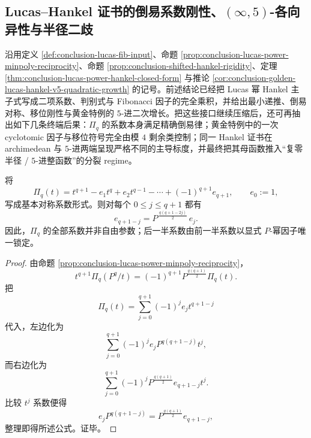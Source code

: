 \subsection{Lucas--Hankel 证书的倒易系数刚性、\texorpdfstring{$(\infty,5)$}{(∞,5)}-各向异性与半径二歧}\label{subsec:conclusion-lucas-hankel-reciprocity-anisotropy-radius}
沿用定义 \ref{def:conclusion-lucas-fib-input}、命题 \ref{prop:conclusion-lucas-power-minpoly-reciprocity}、命题 \ref{prop:conclusion-shifted-hankel-rigidity}、定理 \ref{thm:conclusion-lucas-power-hankel-closed-form} 与推论 \ref{cor:conclusion-golden-lucas-hankel-v5-quadratic-growth} 的记号。前述结论已经把 Lucas 幂 Hankel 主子式写成二项系数、判别式与 Fibonacci 因子的完全乘积，并给出最小递推、倒易对称、移位刚性与黄金特例的 \(5\)-进二次增长。把这些接口继续压缩后，还可再抽出如下几条终端后果：\(\Pi_q\) 的系数本身满足精确倒易律；黄金特例中的一次 cyclotomic 因子与移位符号完全由模 \(4\) 剩余类控制；同一 Hankel 证书在 archimedean 与 \(5\)-进两端呈现严格不同的主导标度，并最终把其母函数推入“复零半径 / \(5\)-进整函数”的分裂 regime。

\begin{corollary}\label{cor:conclusion-lucas-piq-coefficient-reciprocity}
将
\[
\Pi_q(t)
=
t^{q+1}-e_1t^q+e_2t^{q-1}-\cdots+(-1)^{q+1}e_{q+1},
\qquad
e_0:=1,
\]
写成基本对称系数形式。则对每个 \(0\le j\le q+1\) 都有
\[
e_{q+1-j}
=
P^{\,\frac{q(q+1-2j)}{2}}\,e_j.
\]
因此，\(\Pi_q\) 的全部系数并非自由参数；后一半系数由前一半系数以显式 \(P\)-幂因子唯一锁定。
\end{corollary}
\begin{proof}
由命题 \ref{prop:conclusion-lucas-power-minpoly-reciprocity}，
\[
t^{q+1}\Pi_q(P^q/t)
=
(-1)^{q+1}P^{\frac{q(q+1)}{2}}\Pi_q(t).
\]
把
\[
\Pi_q(t)=\sum_{j=0}^{q+1}(-1)^je_jt^{q+1-j}
\]
代入，左边化为
\[
\sum_{j=0}^{q+1}(-1)^j e_j P^{q(q+1-j)} t^j,
\]
而右边化为
\[
\sum_{j=0}^{q+1}(-1)^j P^{\frac{q(q+1)}{2}} e_{q+1-j} t^j.
\]
比较 \(t^j\) 系数便得
\[
e_jP^{q(q+1-j)}
=
P^{\frac{q(q+1)}{2}}e_{q+1-j},
\]
整理即得所述公式。证毕。
\end{proof}

